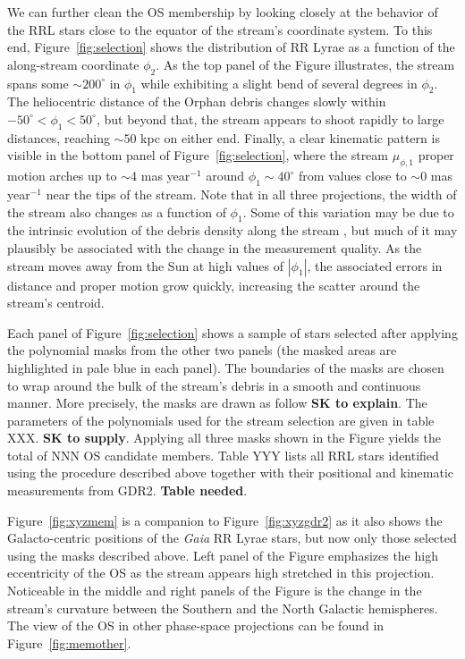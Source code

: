 \documentclass[a4paper,useAMS,usenatbib]{mnras}
\newcommand{\gaia}{\textit{Gaia} }
\begin{document}
We can further clean the OS membership by looking closely at the
behavior of the RRL stars close to the equator of the stream's
coordinate system. To this end, Figure~\ref{fig:selection} shows the
distribution of RR Lyrae as a function of the along-stream coordinate
$\phi_2$. As the top panel of the Figure illustrates, the stream spans
some $\sim200^{\circ}$ in $\phi_1$ while exhibiting a slight bend of
several degrees in $\phi_2$. The heliocentric distance of the Orphan
debris changes slowly within $-50^{\circ}<\phi_1<50^{\circ}$, but
beyond that, the stream appears to shoot rapidly to large distances,
reaching $\sim50$ kpc on either end. Finally, a clear kinematic
pattern is visible in the bottom panel of Figure~\ref{fig:selection},
where the stream $\mu_{\phi,1}$ proper motion arches up to $\sim$4 mas
year$^{-1}$ around $\phi_1\sim40^{\circ}$ from values close to $\sim0$
mas year$^{-1}$ near the tips of the stream. Note that in all three
projections, the width of the stream also changes as a function of
$\phi_1$. Some of this variation may be due to the intrinsic evolution
of the debris density along the stream \citep[see e.g.][]{stray}, but
much of it may plausibly be associated with the change in the
measurement quality. As the stream moves away from the Sun at high
values of $|\phi_1|$, the associated errors in distance and proper
motion grow quickly, increasing the scatter around the stream's
centroid. 

Each panel of Figure~\ref{fig:selection} shows a sample of stars
selected after applying the polynomial masks from the other two panels
(the masked areas are highlighted in pale blue in each panel). The
boundaries of the masks are chosen to wrap around the bulk of the
stream's debris in a smooth and continuous manner. More precisely, the
masks are drawn as follow {\bf SK to explain}. The parameters of the
polynomials used for the stream selection are given in table XXX. {\bf
  SK to supply}. Applying all three masks shown in the Figure yields
the total of NNN OS candidate members. Table YYY lists all RRL stars
identified using the procedure described above together with their
positional and kinematic measurements from GDR2. {\bf Table
  needed}.

Figure~\ref{fig:xyzmem} is a companion to Figure~\ref{fig:xyzgdr2} as
it also shows the Galacto-centric positions of the \gaia RR Lyrae
stars, but now only those selected using the masks described
above. Left panel of the Figure emphasizes the high eccentricity of
the OS as the stream appears high stretched in this
projection. Noticeable in the middle and right panels of the Figure is
the change in the stream's curvature between the Southern and the
North Galactic hemispheres. The view of the OS in other phase-space
projections can be found in Figure~\ref{fig:memother}.
\end{document}
